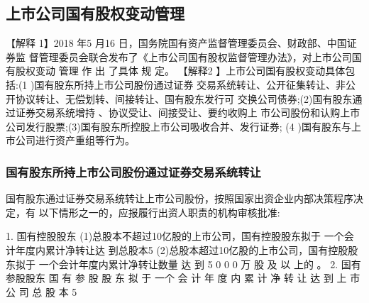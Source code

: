\documentclass[UTF8,12pt]{ctexart}
\numberwithin{equation}{section} %
\numberwithin{figure}{section}
\numberwithin{table}{section}
\begin{document}
	
	\subsection{上市公司国有股权变动管理}	
	【解释 1】2018 年5 月16 日，国务院国有资产监督管理委员会、财政部、中国证券监
	督管理委员会联合发布了《上市公司国有股权监督管理办法》，对上市公司国有股权变动
	管理 作 出 了具体 规 定。
	【解释2 】上市公司国有股权变动具体包括:(1 )国有股东所持上市公司股份通过证券
	交易系统转让、公开征集转让、非公开协议转让、无偿划转、间接转让、国有股东发行可
	交换公司债券;(2)国有股东通过证券交易系统增持 、协议受让、间接受让、要约收购上
	市公司股份和认购上市公司发行股票;(3)国有股东所控股上市公司吸收合并、发行证券;
	(4 )国有股东与上市公司进行资产重组等行为。
	
	\subsubsection{国有股东所持上市公司股份通过证券交易系统转让}
	国有股东通过证券交易系统转让上市公司股份，按照国家出资企业内部决策程序决定，有
	以下情形之一的，应报履行出资人职责的机构审核批准:

	1. 国有控股股东
	(1)总股本不超过10亿股的上市公司，国有控股股东拟于 一个会计年度内累计净转让达
	到总股本5%
	(2)总股本超过10亿股的上市公司，国有控股股东拟于 一个会计年度内累计净转让数量
	达 到 5 0 0 0 万 股 及 以 上的 。
	2. 国有参股股东
	国 有 参 股 股 东 拟 于 一个 会 计 年 度 内 累 计 净 转 让 达 到 上 市 公 司 总 股 本 5 %
	
\end{document}
